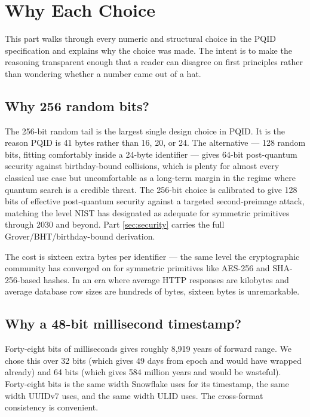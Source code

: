 \section{Why Each Choice}
\label{sec:rationale}

This part walks through every numeric and structural choice in the PQID specification and explains why the choice was made. The intent is to make the reasoning transparent enough that a reader can disagree on first principles rather than wondering whether a number came out of a hat.

\subsection{Why 256 random bits?}

The 256-bit random tail is the largest single design choice in PQID. It is the reason PQID is 41 bytes rather than 16, 20, or 24. The alternative --- 128 random bits, fitting comfortably inside a 24-byte identifier --- gives 64-bit post-quantum security against birthday-bound collisions, which is plenty for almost every classical use case but uncomfortable as a long-term margin in the regime where quantum search is a credible threat. The 256-bit choice is calibrated to give 128 bits of effective post-quantum security against a targeted second-preimage attack, matching the level NIST has designated as adequate for symmetric primitives through 2030 and beyond. Part \ref{sec:security} carries the full Grover/BHT/birthday-bound derivation.

The cost is sixteen extra bytes per identifier --- the same level the cryptographic community has converged on for symmetric primitives like AES-256 \citep{fips197} and SHA-256-based \citep{fips180} hashes. In an era where average HTTP responses are kilobytes and average database row sizes are hundreds of bytes, sixteen bytes is unremarkable.

\subsection{Why a 48-bit millisecond timestamp?}

Forty-eight bits of milliseconds gives roughly 8{,}919 years of forward range. We chose this over 32 bits (which gives 49 days from epoch and would have wrapped already) and 64 bits (which gives 584 million years and would be wasteful). Forty-eight bits is the same width Snowflake \citep{snowflake} uses for its timestamp, the same width UUIDv7 \citep{rfc9562} uses, and the same width ULID \citep{ulid} uses. The cross-format consistency is convenient.

